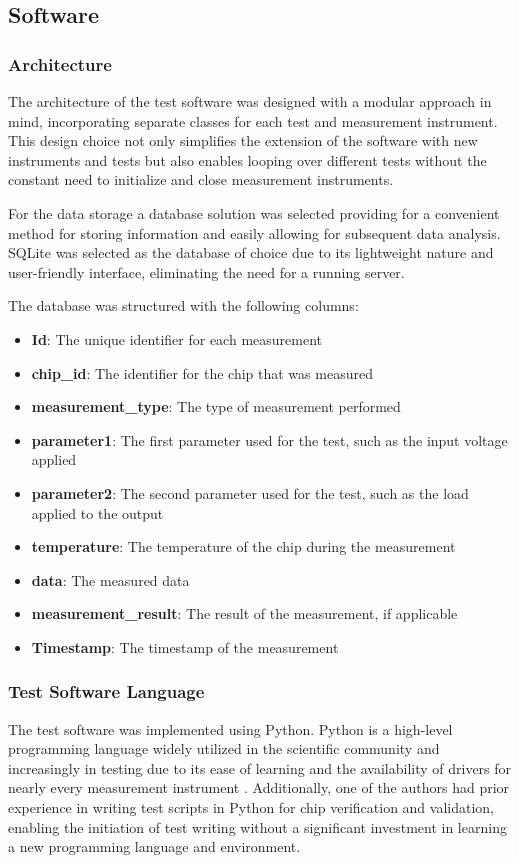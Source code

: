 

\subsection{Software}

\subsubsection{Architecture}
The architecture of the test software was designed with a modular approach in mind, incorporating separate classes for each test and measurement instrument. This design choice not only simplifies the extension of the software with new instruments and tests but also enables looping over different tests without the constant need to initialize and close measurement instruments.

For the data storage a database solution was selected providing for a convenient method for storing information and easily allowing for subsequent data analysis. SQLite was selected as the database of choice due to its lightweight nature and user-friendly interface, eliminating the need for a running server.

The database was structured with the following columns:
\begin{itemize}
    \item \textbf{Id}: The unique identifier for each measurement
    \item \textbf{chip\_id}: The identifier for the chip that was measured
    \item \textbf{measurement\_type}: The type of measurement performed
    \item \textbf{parameter1}: The first parameter used for the test, such as the input voltage applied
    \item \textbf{parameter2}: The second parameter used for the test, such as the load applied to the output
    \item \textbf{temperature}: The temperature of the chip during the measurement
    \item \textbf{data}: The measured data
    \item \textbf{measurement\_result}: The result of the measurement, if applicable
    \item \textbf{Timestamp}: The timestamp of the measurement
\end{itemize}

\subsubsection{Test Software Language}
The test software was implemented using Python. Python is a high-level programming language widely utilized in the scientific community and increasingly in testing due to its ease of learning and the availability of drivers for nearly every measurement instrument \cite{Wikipedia:Python}. Additionally, one of the authors had prior experience in writing test scripts in Python for chip verification and validation, enabling the initiation of test writing without a significant investment in learning a new programming language and environment.

